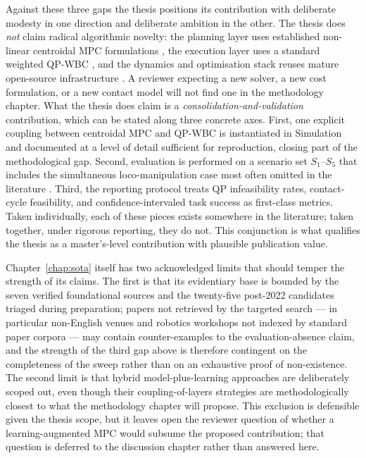 Against these three gaps the thesis positions its contribution with
deliberate modesty in one direction and deliberate ambition in the
other. The thesis does \emph{not} claim radical algorithmic novelty:
the planning layer uses established non-linear centroidal MPC
formulations \cite{Romualdi2023,Elobaid2023}, the execution layer uses a
standard weighted QP-WBC \cite{Wensing2013,Koolen2016}, and the
dynamics and optimisation stack reuses mature open-source infrastructure
\cite{Pinocchio,Crocoddyl}. A reviewer expecting a new solver, a new
cost formulation, or a new contact model will not find one in the
methodology chapter. What the thesis does claim is a
\emph{consolidation-and-validation} contribution, which can be stated
along three concrete axes. First, one explicit coupling between
centroidal MPC and QP-WBC is instantiated in Simulation and documented
at a level of detail sufficient for reproduction, closing part of the
methodological gap. Second, evaluation is performed on a scenario set
$S_1$--$S_5$ that includes the simultaneous loco-manipulation case most
often omitted in the literature \cite{Sleiman2021,Fernbach2018}. Third,
the reporting protocol treats QP infeasibility rates, contact-cycle
feasibility, and confidence-intervaled task success as first-class
metrics. Taken individually, each of these pieces exists somewhere in
the literature; taken together, under rigorous reporting, they do not.
This conjunction is what qualifies the thesis as a master's-level
contribution with plausible publication value.

\begin{criticalinsight}
Chapter~\ref{chap:sota} itself has two acknowledged limits that should
temper the strength of its claims. The first is that its evidentiary
base is bounded by the seven verified foundational sources and the
twenty-five post-2022 candidates triaged during preparation; papers not
retrieved by the targeted search --- in particular non-English venues
and robotics workshops not indexed by standard paper corpora --- may
contain counter-examples to the evaluation-absence claim, and the
strength of the third gap above is therefore contingent on the
completeness of the sweep rather than on an exhaustive proof of
non-existence. The second limit is that hybrid model-plus-learning
approaches \cite{LeCleach2024,Radosavovic2024} are deliberately scoped
out, even though their coupling-of-layers strategies are methodologically
closest to what the methodology chapter will propose. This exclusion is
defensible given the thesis scope, but it leaves open the reviewer
question of whether a learning-augmented MPC would subsume the proposed
contribution; that question is deferred to the discussion chapter
rather than answered here.
\end{criticalinsight}


